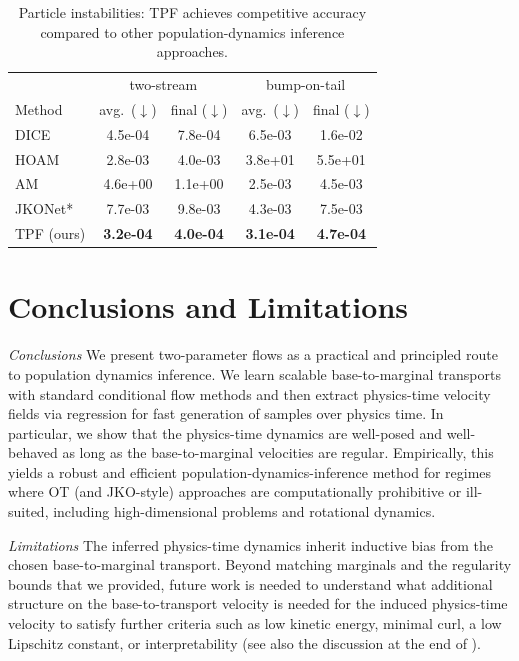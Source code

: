 \documentclass{article}
\theoremstyle{definition}
\theoremstyle{plain}
\theoremstyle{definition}
\theoremstyle{remark}
\begin{document}
\begin{table}
\centering
\caption{Particle instabilities: TPF achieves competitive accuracy compared to other population-dynamics inference approaches.}
\label{tab:w2}
\begin{tabular}{l|cc|cc}
\toprule
 & \multicolumn{2}{c|}{two-stream} & \multicolumn{2}{c}{bump-on-tail} \\
Method 
& avg.\  ($\downarrow$) & final ($\downarrow$)
& avg.\  ($\downarrow$)& final  ($\downarrow$) \\
\midrule
DICE & 4.5e-04 & 7.8e-04 & 6.5e-03 & 1.6e-02 \\
HOAM & 2.8e-03 & 4.0e-03 & 3.8e+01 & 5.5e+01 \\
AM & 4.6e+00 & 1.1e+00 & 2.5e-03 & 4.5e-03 \\
JKONet* & 7.7e-03 &	9.8e-03	& 4.3e-03 &	7.5e-03
 \\
TPF (ours) & \textbf{3.2e-04} & \textbf{4.0e-04} & \textbf{3.1e-04} & \textbf{4.7e-04} \\
\bottomrule
\end{tabular}
\end{table}





\section{Conclusions and Limitations}
\emph{Conclusions} We present two-parameter flows as a practical and principled route to population dynamics inference. We learn scalable base-to-marginal transports with standard conditional flow methods and then extract physics-time velocity fields via regression for fast generation of samples over physics time. In particular, we show that the physics-time dynamics are well-posed and well-behaved as long as the base-to-marginal velocities are regular. Empirically, this yields a robust and efficient population-dynamics-inference method for regimes where OT (and JKO-style) approaches are computationally prohibitive or ill-suited, including high-dimensional problems and rotational dynamics. 

\emph{Limitations} The inferred physics-time dynamics inherit inductive bias from the chosen base-to-marginal transport. Beyond matching marginals and the regularity bounds that we provided, future work is needed to understand what additional structure on the base-to-transport velocity is needed for the induced physics-time velocity to satisfy further criteria such as low kinetic energy, minimal curl, a low Lipschitz constant, or interpretability (see also the discussion at the end of ).
\end{document}
